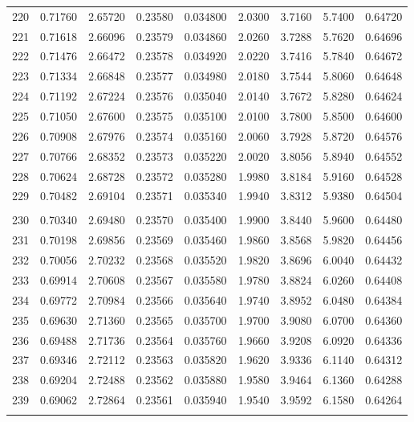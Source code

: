 \documentclass[letter,twosides,10pt]{article}
\begin{document}
\begin{longtable}{|c|c|c|c|c|c|c|c|c|}
220 & 0.71760 & 2.65720 & 0.23580 & 0.034800 & 2.0300 & 3.7160 & 5.7400 & 0.64720 \\
221 & 0.71618 & 2.66096 & 0.23579 & 0.034860 & 2.0260 & 3.7288 & 5.7620 & 0.64696 \\
222 & 0.71476 & 2.66472 & 0.23578 & 0.034920 & 2.0220 & 3.7416 & 5.7840 & 0.64672 \\
223 & 0.71334 & 2.66848 & 0.23577 & 0.034980 & 2.0180 & 3.7544 & 5.8060 & 0.64648 \\
224 & 0.71192 & 2.67224 & 0.23576 & 0.035040 & 2.0140 & 3.7672 & 5.8280 & 0.64624 \\
225 & 0.71050 & 2.67600 & 0.23575 & 0.035100 & 2.0100 & 3.7800 & 5.8500 & 0.64600 \\
226 & 0.70908 & 2.67976 & 0.23574 & 0.035160 & 2.0060 & 3.7928 & 5.8720 & 0.64576 \\
227 & 0.70766 & 2.68352 & 0.23573 & 0.035220 & 2.0020 & 3.8056 & 5.8940 & 0.64552 \\
228 & 0.70624 & 2.68728 & 0.23572 & 0.035280 & 1.9980 & 3.8184 & 5.9160 & 0.64528 \\
229 & 0.70482 & 2.69104 & 0.23571 & 0.035340 & 1.9940 & 3.8312 & 5.9380 & 0.64504 \\
 & & & & & & & & \\
230 & 0.70340 & 2.69480 & 0.23570 & 0.035400 & 1.9900 & 3.8440 & 5.9600 & 0.64480 \\
231 & 0.70198 & 2.69856 & 0.23569 & 0.035460 & 1.9860 & 3.8568 & 5.9820 & 0.64456 \\
232 & 0.70056 & 2.70232 & 0.23568 & 0.035520 & 1.9820 & 3.8696 & 6.0040 & 0.64432 \\
233 & 0.69914 & 2.70608 & 0.23567 & 0.035580 & 1.9780 & 3.8824 & 6.0260 & 0.64408 \\
234 & 0.69772 & 2.70984 & 0.23566 & 0.035640 & 1.9740 & 3.8952 & 6.0480 & 0.64384 \\
235 & 0.69630 & 2.71360 & 0.23565 & 0.035700 & 1.9700 & 3.9080 & 6.0700 & 0.64360 \\
236 & 0.69488 & 2.71736 & 0.23564 & 0.035760 & 1.9660 & 3.9208 & 6.0920 & 0.64336 \\
237 & 0.69346 & 2.72112 & 0.23563 & 0.035820 & 1.9620 & 3.9336 & 6.1140 & 0.64312 \\
238 & 0.69204 & 2.72488 & 0.23562 & 0.035880 & 1.9580 & 3.9464 & 6.1360 & 0.64288 \\
239 & 0.69062 & 2.72864 & 0.23561 & 0.035940 & 1.9540 & 3.9592 & 6.1580 & 0.64264 \\
 & & & & & & & & \\

\end{longtable}
\end{document}
